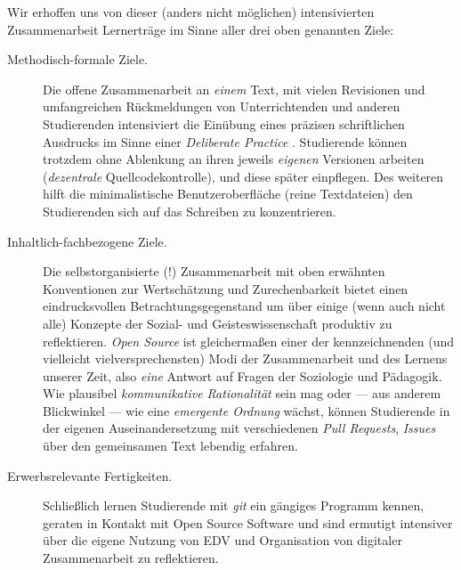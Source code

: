 \documentclass[11pt,a4paper,oneside]{article}
\begin{document}
Wir erhoffen uns von dieser (anders nicht möglichen) intensivierten Zusammenarbeit Lernerträge im Sinne aller drei oben genannten Ziele:
\begin{description}
	\item[Methodisch-formale Ziele.]
		Die offene Zusammenarbeit an \emph{einem} Text, mit vielen Revisionen und umfangreichen Rückmeldungen von Unterrichtenden und anderen Studierenden intensiviert die Einübung eines präzisen schriftlichen Ausdrucks im Sinne einer \emph{Deliberate Practice} \cite{Ericsson2007}.
		Studierende können trotzdem ohne Ablenkung an ihren jeweils \emph{eigenen} Versionen arbeiten (\emph{dezentrale} Quellcodekontrolle), und diese später einpflegen.
		Des weiteren hilft die minimalistische Benutzeroberfläche (reine Textdateien) den Studierenden sich auf das Schreiben zu konzentrieren.
	\item[Inhaltlich-fachbezogene Ziele.]
		Die selbstorganisierte (!) Zusammenarbeit mit oben erwähnten Konventionen zur Wertschätzung und Zurechenbarkeit bietet einen eindrucksvollen Betrachtungsgegenstand um über einige (wenn auch nicht alle) Konzepte der Sozial- und Geisteswissenschaft produktiv zu reflektieren.
		\emph{Open Source} ist gleichermaßen einer der kennzeichnenden (und vielleicht vielversprechensten) Modi der Zusammenarbeit und des Lernens unserer Zeit, also \emph{eine} Antwort auf Fragen der Soziologie und Pädagogik.
		Wie plausibel \emph{kommunikative Rationalität} \cite{Habermas-1984} sein mag oder --- aus anderem Blickwinkel --- wie eine \emph{emergente Ordnung} \cite{hamowy_constitution_2011} wächst, können Studierende in der eigenen Auseinandersetzung mit verschiedenen \emph{Pull Requests}, \emph{Issues} über den gemeinsamen Text lebendig erfahren.
	\item[Erwerbsrelevante Fertigkeiten.]
		Schließlich lernen  Studierende mit \emph{git} ein gängiges Programm kennen, geraten in Kontakt mit Open Source Software und sind ermutigt intensiver über die eigene Nutzung von EDV und Organisation von digitaler Zusammenarbeit zu reflektieren.
\end{description}


\end{document}

